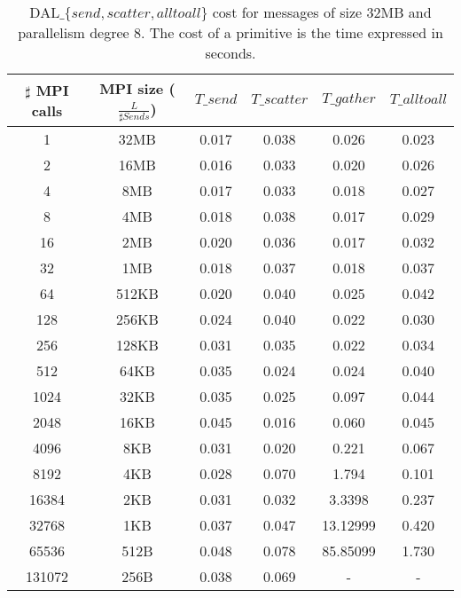 \begin{table}[h]
\begin{center}
\begin{tabular}{|c|c|c|c|c|c|}\hline
\hline
$\sharp$ MPI calls & MPI size ($\frac{L}{\sharp Sends}$)  & $T\_send$   & $T\_scatter$  & $T\_gather$ & $T\_alltoall$      \\\hline\hline
1 & 32MB & 0.017 & 0.038 & 0.026 & 0.023 \\\hline
2 & 16MB & 0.016 & 0.033 & 0.020 & 0.026 \\\hline
4 & 8MB & 0.017 & 0.033 & 0.018 & 0.027 \\\hline
8 & 4MB & 0.018 & 0.038 & 0.017 & 0.029 \\\hline
16 & 2MB & 0.020 & 0.036 & 0.017 & 0.032 \\\hline
32 & 1MB & 0.018 & 0.037 & 0.018 & 0.037 \\\hline
64 & 512KB & 0.020 & 0.040 & 0.025 & 0.042 \\\hline
128 & 256KB & 0.024 & 0.040 & 0.022 & 0.030 \\\hline
256 & 128KB & 0.031 & 0.035 & 0.022 & 0.034 \\\hline
512 & 64KB & 0.035 & 0.024 & 0.024 & 0.040 \\\hline
1024 & 32KB & 0.035 & 0.025 & 0.097 & 0.044 \\\hline
2048 & 16KB & 0.045 & 0.016 & 0.060 & 0.045 \\\hline
4096 & 8KB & 0.031 & 0.020 & 0.221 & 0.067 \\\hline
8192 & 4KB & 0.028 & 0.070 & 1.794 & 0.101 \\\hline
16384 & 2KB & 0.031 & 0.032 & 3.3398 & 0.237 \\\hline
32768 & 1KB & 0.037 & 0.047 & 13.12999 & 0.420 \\\hline
65536 & 512B & 0.048 & 0.078 & 85.85099 & 1.730 \\\hline
131072 & 256B & 0.038 & 0.069 & - & - \\\hline
\end{tabular}
\caption{DAL$\_\lbrace send, scatter, alltoall \rbrace$ cost for messages of size 32MB and parallelism degree 8. The cost of a primitive is the time expressed in seconds.}
\label{tsetup-pcm-n8-M32}
\end{center}
\end{table}

